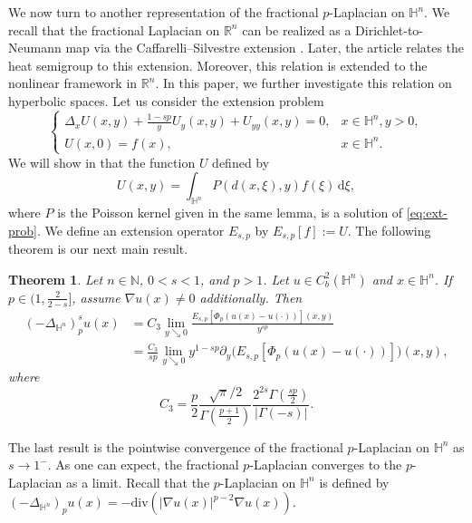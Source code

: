 \documentclass[11pt]{amsart}
\theoremstyle{plain}
\newtheorem{theorem}{Theorem}[section]
\theoremstyle{definition}
\numberwithin{equation}{section}
\begin{document}
We now turn to another representation of the fractional $p$-Laplacian on $\mathbb{H}^{n}$. We recall that the fractional Laplacian on $\mathbb{R}^{n}$ can be realized as a Dirichlet-to-Neumann map via the Caffarelli--Silvestre extension \cite{CS07}. Later, the article \cite{ST10} relates the heat semigroup to this extension. Moreover, this relation is extended to the nonlinear framework \cite{dTGCV21} in $\mathbb{R}^{n}$. In this paper, we further investigate this relation on hyperbolic spaces. Let us consider the extension problem
\begin{equation} \label{eq:ext-prob}
\begin{cases}
\displaystyle\Delta_{x} U(x,y) + \frac{1-sp}{y} U_{y}(x,y) + U_{yy}(x,y) = 0, &x \in \mathbb{H}^{n}, y > 0, \\
U(x,0) = f(x), &x \in \mathbb{H}^{n}.
\end{cases}
\end{equation}
We will show in  that the function $U$ defined by
\begin{equation*}
U(x,y) = \int_{\mathbb{H}^{n}} P(d(x,\xi), y) f(\xi) \,\mathrm{d}\xi,
\end{equation*}
where $P$ is the Poisson kernel given in the same lemma, is a solution of \eqref{eq:ext-prob}. We define an extension operator $E_{s, p}$ by $E_{s, p}[f] := U$. The following theorem is our next main result.

\begin{theorem} \label{thm:extension}
Let $n \in \mathbb{N}$, $0<s<1$, and $p > 1$. Let $u \in C^{2}_{b}(\mathbb{H}^{n})$ and $x \in \mathbb{H}^{n}$. If $p \in (1,\frac{2}{2-s}]$, assume $\nabla u(x) \neq 0$ additionally. Then
\begin{equation*}
\begin{split}
(-\Delta_{\mathbb{H}^{n}})^{s}_{p} u(x)
&= C_{3} \lim_{y \searrow 0} \frac{E_{s, p}[\Phi_{p}(u(x)-u(\cdot))](x, y)}{y^{sp}} \\
&= \frac{C_{3}}{sp} \lim_{y \searrow 0} y^{1-sp} \partial_{y} \Big( E_{s, p}[\Phi_{p}(u(x)-u(\cdot))] \Big) (x, y),
\end{split}
\end{equation*}
where
\begin{equation*}
C_{3} = \frac{p}{2} \frac{\sqrt{\pi}/2}{\Gamma(\frac{p+1}{2})} \frac{2^{2s} \Gamma(\frac{sp}{2})}{|\Gamma(-s)|}.
\end{equation*}
\end{theorem}

The last result is the pointwise convergence of the fractional $p$-Laplacian on $\mathbb{H}^{n}$ as $s \to 1^{-}$. As one can expect, the fractional $p$-Laplacian converges to the $p$-Laplacian as a limit. Recall that the $p$-Laplacian on $\mathbb{H}^{n}$ is defined by $(-\Delta_{\mathbb{H}^{n}})_{p} u(x) = -\mathrm{div}(|\nabla u(x)|^{p-2} \nabla u(x))$.
\end{document}
